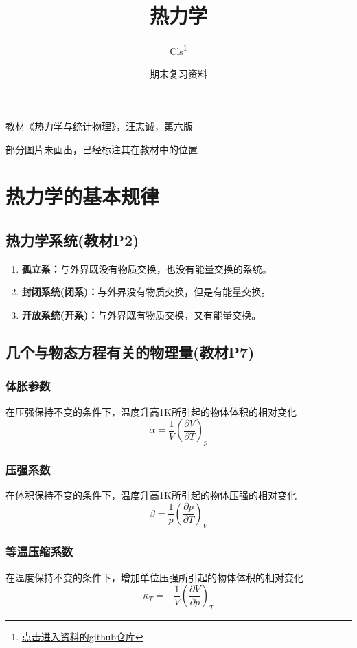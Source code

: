 \documentclass[oneside]{ctexbook}
\title{热力学}
\author{Cls\thanks{\href{https://github.com/Clignniis}{点击进入资料的github仓库}}}
\date{期末复习资料}
\begin{document}
\maketitle

教材《热力学与统计物理》，汪志诚，第六版

部分图片未画出，已经标注其在教材中的位置

\tableofcontents

\chapter{热力学的基本规律}

\section{热力学系统(教材P2)}
\begin{enumerate}
    \item \textbf{孤立系：}与外界既没有物质交换，也没有能量交换的系统。
    \item \textbf{封闭系统(闭系)：}与外界没有物质交换，但是有能量交换。
    \item \textbf{开放系统(开系)：}与外界既有物质交换，又有能量交换。
\end{enumerate}

\section{几个与物态方程有关的物理量(教材P7)}

\subsection{体胀参数}

在压强保持不变的条件下，温度升高1K所引起的物体体积的相对变化
\begin{equation}
\alpha=\dfrac{1}{V}\left(\dfrac{\partial{}V}{\partial{}T}\right)_p
\end{equation}

\subsection{压强系数}

在体积保持不变的条件下，温度升高1K所引起的物体压强的相对变化
\begin{equation}
\beta=\dfrac1p\left(\dfrac{\partial{}p}{\partial{}T}\right)_V
\end{equation}

\subsection{等温压缩系数}
在温度保持不变的条件下，增加单位压强所引起的物体体积的相对变化
\begin{equation}
\kappa_T=-\dfrac{1}{V}\left(\dfrac{\partial{}V}{\partial{p}}\right)_T
\end{equation}
\end{document}
